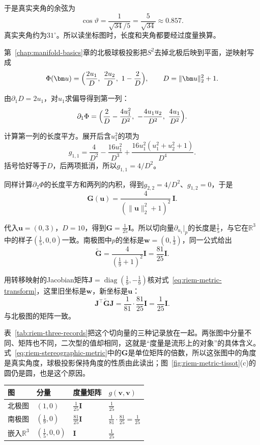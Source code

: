 于是真实夹角的余弦为
\[
\cos\vartheta=\frac{1}{\sqrt{34}/5}=\frac{5}{\sqrt{34}}\approx0.857 .
\]
真实夹角约为$31^\circ$。所以读坐标图时，长度和夹角都要经过度量换算。

\begin{example}[北极图中的度量]
\label{ex:riem-sphere-north-chart}
第~\ref{chap:manifold-basics}章的北极球极投影把$S^2$去掉北极后映到平面，逆映射写成
\[
\Phi(\bm u)=\Bigl(\frac{2u_1}{D},\ \frac{2u_2}{D},\ 1-\frac2D\Bigr),\qquad D=\lVert\bm u\rVert_2^2+1 .
\]

由$\partial_1D=2u_1$，对$u_1$求偏导得到第一列：
\[
\partial_1\Phi=\Bigl(\frac2D-\frac{4u_1^2}{D^2},\ -\frac{4u_1u_2}{D^2},\ \frac{4u_1}{D^2}\Bigr).
\]

计算第一列的长度平方。展开后含$u_1^2$的项为
\[
g_{1,1}=\frac4{D^2}-\frac{16u_1^2}{D^3}+\frac{16u_1^2(u_1^2+u_2^2+1)}{D^4}.
\]
括号恰好等于$D$，后两项抵消，所以$g_{1,1}=4/D^2$。

同样计算$\partial_2\Phi$的长度平方和两列的内积，得到$g_{2,2}=4/D^2$、$g_{1,2}=0$，于是
\begin{equation}
\bm G(\bm u)=\frac{4}{(\lVert\bm u\rVert_2^2+1)^2}\,\bm I .
\label{eq:riem-stereographic-metric}
\end{equation}

代入$\bm u=(0,3)$，$D=10$，得到$\bm G=\tfrac1{25}\bm I$。所以切向量$\partial_{u_1}|_p$的长度是$\tfrac15$，与它在$\mathbb R^3$中的样子$(\tfrac15,0,0)$一致。南极图中$p$的坐标是$\bm w=(0,\tfrac13)$，同一公式给出
\[
\widetilde{\bm G}=\frac{4}{(\tfrac19+1)^2}\bm I=\frac{81}{25}\bm I .
\]

用转移映射的Jacobian矩阵$\bm J=\operatorname{diag}(\tfrac19,-\tfrac19)$核对式~\eqref{eq:riem-metric-transform}，这里旧坐标是$\bm w$，新坐标是$\bm u$：
\[
\bm J^\top\widetilde{\bm G}\bm J=\frac1{81}\cdot\frac{81}{25}\bm I=\frac1{25}\bm I .
\]
与北极图的矩阵一致。
\end{example}

表~\ref{tab:riem-three-records}把这个切向量的三种记录放在一起。两张图中分量不同、矩阵也不同，二次型的值却相同，这就是“度量是流形上的对象”的具体含义。式~\eqref{eq:riem-stereographic-metric}中的$\bm G$是单位矩阵的倍数，所以这张图中的角度是真实角度，球极投影保持角度的性质由此读出；图~\ref{fig:riem-metric-tissot}(c)的圆仍是圆，也是这个原因。

\begin{BookInlineTable}
  \centering
  \begin{tabular}{llll}
    \toprule
    图 & 分量 & 度量矩阵 & $g(\bm v,\bm v)$\\
    \midrule
    北极图 & $(1,0)$ & $\tfrac1{25}\bm I$ & $\tfrac1{25}$\\
    南极图 & $(\tfrac19,0)$ & $\tfrac{81}{25}\bm I$ & $\tfrac1{81}\cdot\tfrac{81}{25}=\tfrac1{25}$\\
    嵌入$\mathbb R^3$ & $(\tfrac15,0,0)$ & $\bm I$ & $\tfrac1{25}$\\
    \bottomrule
  \end{tabular}
  \caption{$p=(0,\tfrac35,\tfrac45)$处切向量$\partial_{u_1}|_p$在三种记录下的分量、度量矩阵与长度平方。}
  \label{tab:riem-three-records}
\end{BookInlineTable}

